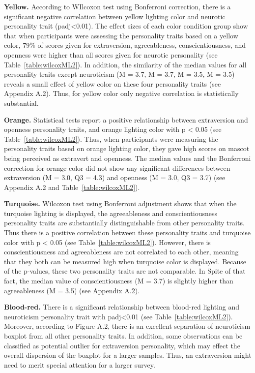 \par \textbf{Yellow.} According to WIlcoxon test using Bonferroni correction, there is a significant negative correlation between yellow lighting color and neurotic personality trait (padj<0.01). The effect sizes of each color condition group show that when participants were assessing the personality traits based on a yellow color, 79\% of scores given for extraversion, agreeableness, conscientiousness, and openness were higher than all scores given for neurotic personality (see Table~\ref{table:wilcoxML2}). In addition, the similarity of the median values for all personality traits except neuroticism (M = 3.7, M = 3.7, M = 3.5, M = 3.5) reveals a small effect of yellow color on these four personality traits (see Appendix A.2). Thus, for yellow color only negative correlation is statistically substantial. 
\par \textbf{Orange.} Statistical tests report a positive relationship between extraversion and openness personality traits, and orange lighting color with p < 0.05 (see Table~\ref{table:wilcoxML2}). Thus, when participants were measuring the personality traits based on orange lighting color, they gave high scores on mascot being perceived as extravert and openness. The median values and the Bonferroni correction for orange color did not show any significant differences between extraversion (M = 3.0, Q3 = 4.3) and openness (M = 3.0, Q3 = 3.7) (see Appendix A.2 and Table~\ref{table:wilcoxML2}).
\par \textbf{Turquoise.} Wilcoxon test using Bonferroni adjustment shows that when the turquoise lighting is displayed, the agreeableness and conscientiousness personality traits are substantially distinguishable from other personality traits. Thus there is a positive correlation between these personality traits and turquoise color with p < 0.05 (see Table~\ref{table:wilcoxML2}). However, there is conscientiousness and agreeableness are not correlated to each other, meaning that they both can be measured high when turquoise color is displayed. Because of the p-values, these two personality traits are not comparable. In Spite of that fact, the median value of conscientiousness (M = 3.7) is slightly higher than agreeableness (M = 3.5) (see Appendix A.2). 
\par \textbf{Blood-red.} There is a significant relationship between blood-red lighting and neuroticism personality trait with padj<0.01 (see Table~\ref{table:wilcoxML2}). Moreover, according to Figure A.2, there is an excellent separation of neuroticism boxplot from all other personality traits. In addition, some observations can be classified as potential outlier for extraversion personality, which may effect the overall dispersion of the boxplot for a larger samples. Thus, an extraversion might need to merit special attention for a larger survey.
